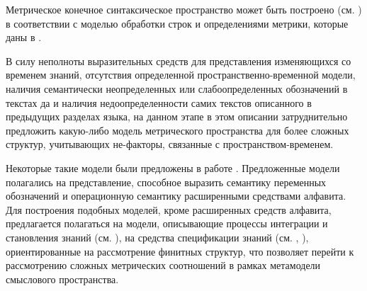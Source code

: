 Метрическое конечное синтаксическое пространство может быть построено (см. ) в соответствии с моделью обработки строк и определениями метрики, которые даны в .

\begin{SCn}
\end{SCn}

\begin{SCn}
\end{SCn}

\begin{SCn}
\end{SCn}

В силу неполноты выразительных средств для представления изменяющихся со временем знаний, отсутствия определенной пространственно-временной модели, наличия семантически неопределенных или слабоопределенных обозначений в текстах да и наличия недоопределенности самих текстов описанного в предыдущих разделах языка, на данном этапе в этом описании затруднительно предложить какую-либо модель метрического пространства для более сложных структур, учитывающих не-факторы, связанные с пространством-временем.

Некоторые такие модели были предложены в работе . Предложенные модели полагались на представление, способное выразить семантику переменных обозначений и операционную семантику расширенными средствами алфавита. Для построения подобных моделей, кроме расширенных средств алфавита, предлагается полагаться на модели, описывающие процессы интеграции и становления знаний (см. ), на средства спецификации знаний (см. , ), ориентированные на рассмотрение финитных структур, что позволяет перейти к рассмотрению сложных метрических соотношений в рамках метамодели смыслового пространства.

